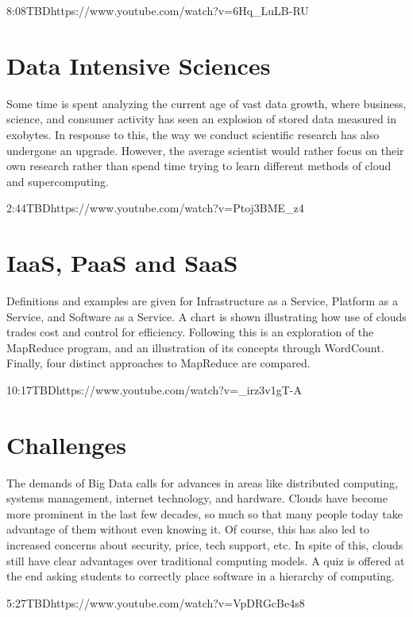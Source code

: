   {8:08}{TBD}{https://www.youtube.com/watch?v=6Hq_LuLB-RU}


\section{Data Intensive Sciences}

Some time is spent analyzing the current age of vast data growth, where
business, science, and consumer activity has seen an explosion of stored
data measured in exobytes. In response to this, the way we conduct
scientific research has also undergone an upgrade. However, the average
scientist would rather focus on their own research rather than spend
time trying to learn different methods of cloud and supercomputing.

  {2:44}{TBD}{https://www.youtube.com/watch?v=Ptoj3BME_z4}


\section{IaaS, PaaS and SaaS}

Definitions and examples are given for Infrastructure as a Service,
Platform as a Service, and Software as a Service. A chart is shown
illustrating how use of clouds trades cost and control for efficiency.
Following this is an exploration of the MapReduce program, and an
illustration of its concepts through WordCount. Finally, four distinct
approaches to MapReduce are compared.

  {10:17}{TBD}{https://www.youtube.com/watch?v=_irz3v1gT-A}


\section{Challenges}

The demands of Big Data calls for advances in areas like distributed
computing, systems management, internet technology, and hardware. Clouds
have become more prominent in the last few decades, so much so that many
people today take advantage of them without even knowing it. Of course,
this has also led to increased concerns about security, price, tech
support, etc. In spite of this, clouds still have clear advantages over
traditional computing models. A quiz is offered at the end asking
students to correctly place software in a hierarchy of computing.

  {5:27}{TBD}{https://www.youtube.com/watch?v=VpDRGcBe4s8}

